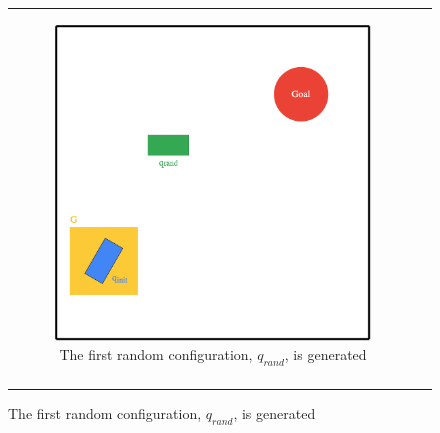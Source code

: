 \begin{figure}[H]
\begin{center}
\begin{tabular}{c c}
\begin{subfigure}{0.45\textwidth}
    \includegraphics[draft=false,width=\linewidth]{chapters/chapter2/img/RRT_step_by_step-B.png}
    \caption{The first random configuration, $q_{rand}$, is generated}
    \label{subfig:rrt-step-by-step-B}
    \end{subfigure} \\ \\


\end{tabular}
\end{center}
\end{figure}
